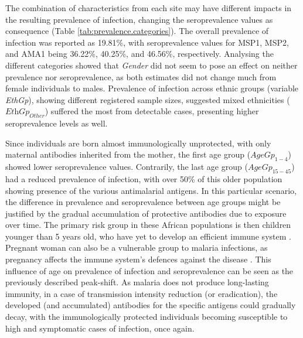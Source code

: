 The combination of characteristics from each site may have different impacts in the resulting prevalence of infection, changing the seroprevalence values as consequence (Table \ref{tab:prevalence.categories}).
The overall prevalence of infection was reported as 19.81\%, with seroprevalence values for MSP1, MSP2, and AMA1 being 36.22\%, 40.25\%, and 46.56\%, respectively.
Analysing the different categories showed that \textit{Gender} did not seem to pose an effect on neither prevalence nor seroprevalence, as both estimates did not change much from female individuals to males.
Prevalence of infection across ethnic groups (variable \textit{EthGp}), showing different registered sample sizes, suggested mixed ethnicities ($\textit{EthGp}_{Other}$) suffered the most from detectable cases, presenting higher seroprevalence levels as well.

Since individuals are born almost immunologically unprotected, with only maternal antibodies inherited from the mother, the first age group ($\textit{AgeGp}_{1-4}$) showed lower seroprevalence values.
Contrarily, the last age group ($AgeGp_{15-45}$) had a reduced prevalence of infection, with over 50\% of this older population showing presence of the various antimalarial antigens.
In this particular scenario, the difference in prevalence and seroprevalence between age groups might be justified by the gradual accumulation of protective antibodies due to exposure over time.
The primary risk group in these African populations is then children younger than 5 years old, who have yet to develop an efficient immune system \cite{snow2002consequences}.
Pregnant woman can also be a vulnerable group to malaria infections, as pregnancy affects the immune system's defences against the disease \cite{carter2002evolutionary,perlmann2002malaria}.
This influence of age on prevalence of infection and seroprevalence can be seen as the previously described peak-shift.
As malaria does not produce long-lasting immunity, in a case of transmission intensity reduction (or eradication), the developed (and accumulated) antibodies for the specific antigens could gradually decay, with the immunologically protected individuals becoming susceptible to high and symptomatic cases of infection, once again.

